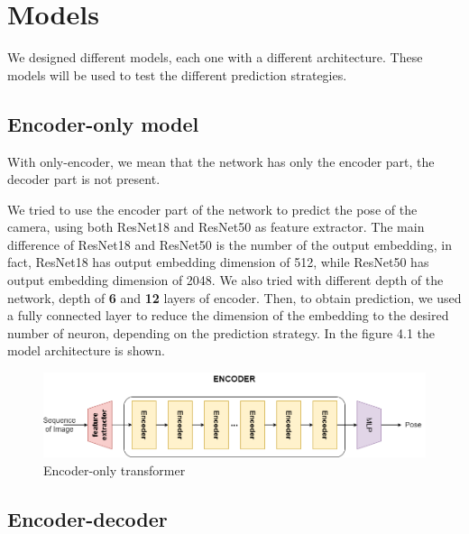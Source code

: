 \section{Models}\label{sec:encoder}
We designed different models, each one with a different architecture.
These models will be used to test the different prediction strategies.
\subsection{Encoder-only model}\label{subsec:encoder-only-model}
With only-encoder, we mean that the network has only the encoder part, the decoder part is not present.

We tried to use the encoder part of the network to predict the pose of the camera, using both ResNet18 and ResNet50 as feature extractor.
The main difference of ResNet18 and ResNet50 is the number of the output embedding, in fact, ResNet18 has output embedding dimension of 512, while ResNet50 has output embedding dimension of 2048.
We also tried with different depth of the network, depth of \textbf{6} and \textbf{12} layers of encoder.
Then, to obtain prediction, we used a fully connected layer to reduce the dimension of the embedding to the desired number of neuron, depending on the prediction strategy.
In the figure 4.1 the model architecture is shown.
\begin{figure}[H]
    \centering
    \includegraphics[width=\textwidth]{images/4_encoder_only}
    \caption{Encoder-only transformer}\label{fig:figure-encoder-only-transformer}
\end{figure}

\subsection{Encoder-decoder}\label{subsec:encoder-decoder}

